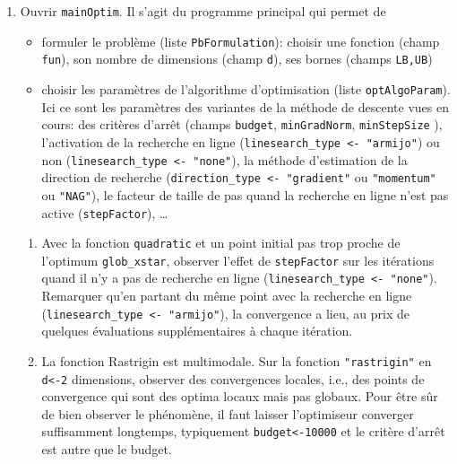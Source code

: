\documentclass[12pt]{article}
\begin{document}
\begin{enumerate}
\item Ouvrir \texttt{mainOptim}. Il s'agit du programme principal qui permet de 
\begin{itemize}
\item formuler le problème (liste \texttt{PbFormulation}): choisir une fonction (champ \texttt{fun}), son nombre de dimensions (champ \texttt{d}), ses bornes (champs \texttt{LB,UB})
\item choisir les paramètres de l'algorithme d'optimisation (liste \texttt{optAlgoParam}).
Ici ce sont les paramètres des variantes de la méthode de descente vues en cours: des critères d'arrêt (champs \texttt{budget}, \texttt{minGradNorm}, \texttt{minStepSize} ), l'activation de la recherche en ligne (\texttt{linesearch\_type <- "armijo"}) ou non (\texttt{linesearch\_type <- "none"}), la méthode d'estimation de la direction de recherche (\texttt{direction\_type <- "gradient"} ou \texttt{"momentum"} ou \texttt{"NAG"}), le facteur de taille de pas quand la recherche en ligne n'est pas active (\texttt{stepFactor}), \ldots
\end{itemize}
\begin{enumerate}
\item Avec la fonction \texttt{quadratic} et un point initial pas trop proche de l'optimum \texttt{glob\_xstar}, observer l'effet de \texttt{stepFactor} sur les itérations quand il n'y a pas de recherche en ligne (\texttt{linesearch\_type <- "none"}). Remarquer qu'en partant du même point avec la recherche en ligne (\texttt{linesearch\_type <- "armijo"}), la convergence a lieu, au prix de quelques évaluations supplémentaires à chaque itération.
\item  La fonction Rastrigin est multimodale. Sur la fonction \texttt{"rastrigin"} en \texttt{d<-2} dimensions, observer des convergences locales, i.e., des points de convergence qui sont des optima locaux mais pas globaux. Pour être sûr de bien observer le phénomène, il faut laisser l'optimiseur converger suffisamment longtemps, typiquement \texttt{budget<-10000} et le critère d'arrêt est autre que le budget.
\end{enumerate}

\end{enumerate}
\end{document}
